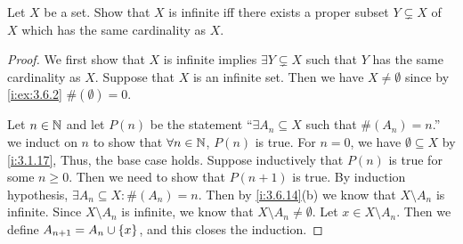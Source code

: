 \exercisesection

\begin{ex}\label{i:ex:8.1.1}
  Let \(X\) be a set.
  Show that \(X\) is infinite iff there exists a proper subset \(Y \subsetneq X\) of \(X\) which has the same cardinality as \(X\).
\end{ex}

\begin{proof}
  We first show that \(X\) is infinite implies \(\exists Y \subsetneq X\) such that \(Y\) has the same cardinality as \(X\).
  Suppose that \(X\) is an infinite set.
  Then we have \(X \neq \emptyset\) since by \cref{i:ex:3.6.2} \(\#(\emptyset) = 0\).

  Let \(n \in \mathbb{N}\) and let \(P(n)\) be the statement ``\(\exists A_n \subseteq X\) such that \(\#(A_n) = n\).''
  we induct on \(n\) to show that \(\forall n \in \mathbb{N}\), \(P(n)\) is true.
  For \(n = 0\), we have \(\emptyset \subseteq X\) by \cref{i:3.1.17}, Thus, the base case holds.
  Suppose inductively that \(P(n)\) is true for some \(n \geq 0\).
  Then we need to show that \(P(n + 1)\) is true.
  By induction hypothesis, \(\exists A_n \subseteq X : \#(A_n) = n\).
  Then by \cref{i:3.6.14}(b) we know that \(X \setminus A_n\) is infinite.
  Since \(X \setminus A_n\) is infinite, we know that \(X \setminus A_n \neq \emptyset\).
  Let \(x \in X \setminus A_n\).
  Then we define \(A_{n + 1} = A_n \cup \left\lbrace x\right\rbrace\), and this closes the induction.


\end{proof}
